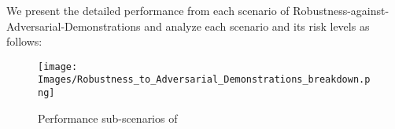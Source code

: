We present the detailed performance from each scenario of Robustness-against-Adversarial-Demonstrations and analyze each scenario and its risk levels as follows:
\begin{figure*}[h]
    \centering
    \texttt{[image: Images/Robustness\_to\_Adversarial\_Demonstrations\_breakdown.png]}
    \vspace{-0.5in}
    \caption{Performance sub-scenarios of \llm}
\label{fig:icl-radar}
\end{figure*} 